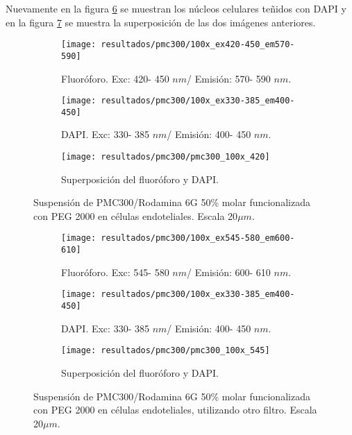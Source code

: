 Nuevamente en la figura \ref{nucliitos} se muestran los n\'ucleos celulares te\~{n}idos con DAPI y en la figura \ref{rosita} se muestra la superposici\'on de las dos im\'agenes anteriores.




\begin{figure}[H]
\centering
\begin{subfigure}{\textwidth}
\centering
\texttt{[image: resultados/pmc300/100x\_ex420-450\_em570-590]}\caption{Fluor\'oforo. Exc: 420- 450 $nm$/ Emisi\'on: 570- 590 $nm$.}\label{apmc}
\end{subfigure}
\begin{subfigure}{\textwidth}
\centering
\texttt{[image: resultados/pmc300/100x\_ex330-385\_em400-450]}\caption{DAPI. Exc: 330- 385 $nm$/ Emisi\'on: 400- 450 $nm$.}\label{bpmc}
\end{subfigure}
\begin{subfigure}{\textwidth}
\centering
\texttt{[image: resultados/pmc300/pmc300\_100x\_420]}\caption{Superposici\'on del fluor\'oforo y DAPI.}\label{merged}
\end{subfigure}
\caption{Suspensi\'on de PMC300/Rodamina 6G 50\% molar funcionalizada con PEG 2000 en c\'elulas endoteliales. Escala 20$\mu m$.}
\label{celulaspm}
\end{figure}





\begin{figure}[H]
\centering
\begin{subfigure}{\textwidth}
\centering
\texttt{[image: resultados/pmc300/100x\_ex545-580\_em600-610]}\caption{Fluor\'oforo. Exc: 545- 580 $nm$/ Emisi\'on: 600- 610 $nm$.}\label{rojilla}
\end{subfigure}
\begin{subfigure}{\textwidth}
\centering
\texttt{[image: resultados/pmc300/100x\_ex330-385\_em400-450]}\caption{DAPI. Exc: 330- 385 $nm$/ Emisi\'on: 400- 450 $nm$.}\label{nucliitos}
\end{subfigure}
\begin{subfigure}{\textwidth}
\centering
\texttt{[image: resultados/pmc300/pmc300\_100x\_545]}\caption{Superposici\'on del fluor\'oforo y DAPI.}\label{rosita}
\end{subfigure}
\caption{Suspensi\'on de PMC300/Rodamina 6G 50\% molar funcionalizada con PEG 2000 en c\'elulas endoteliales, utilizando otro filtro. Escala 20$\mu m$.}
\label{nomamswow}
\end{figure}





